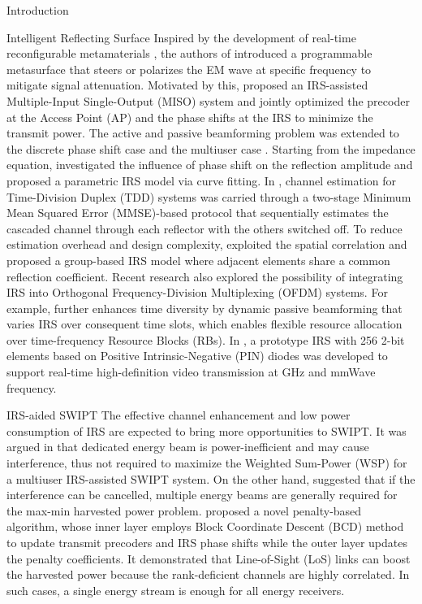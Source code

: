 \documentclass[journal]{IEEEtran}
\begin{document}
\begin{section}{Introduction}
\begin{subsection}{Intelligent Reflecting Surface}
			Inspired by the development of real-time reconfigurable metamaterials \cite{Cui2014}, the authors of \cite{Liaskos2018} introduced a programmable metasurface that steers or polarizes the EM wave at specific frequency to mitigate signal attenuation. Motivated by this, \cite{Wu2018} proposed an IRS-assisted Multiple-Input Single-Output (MISO) system and jointly optimized the precoder at the Access Point (AP) and the phase shifts at the IRS to minimize the transmit power. The active and passive beamforming problem was extended to the discrete phase shift case \cite{Wu2019a} and the multiuser case \cite{Wu2019}. Starting from the impedance equation, \cite{Abeywickrama2019} investigated the influence of phase shift on the reflection amplitude and proposed a parametric IRS model via curve fitting. In \cite{Nadeem2019}, channel estimation for Time-Division Duplex (TDD) systems was carried through a two-stage Minimum Mean Squared Error (MMSE)-based protocol that sequentially estimates the cascaded channel through each reflector with the others switched off. To reduce estimation overhead and design complexity, \cite{Yang2019} exploited the spatial correlation and proposed a group-based IRS model where adjacent elements share a common reflection coefficient. Recent research also explored the possibility of integrating IRS into Orthogonal Frequency-Division Multiplexing (OFDM) systems. For example, \cite{Yang2020} further enhances time diversity by dynamic passive beamforming that varies IRS over consequent time slots, which enables flexible resource allocation over time-frequency Resource Blocks (RBs). In \cite{Dai2020}, a prototype IRS with \num{256} \num{2}-bit elements based on Positive Intrinsic-Negative (PIN) diodes was developed to support real-time high-definition video transmission at \si{GHz} and mmWave frequency.
		\end{subsection}


		\begin{subsection}{IRS-aided SWIPT}
			The effective channel enhancement and low power consumption of IRS are expected to bring more opportunities to SWIPT. It was argued in \cite{Wu2019b} that dedicated energy beam is power-inefficient and may cause interference, thus not required to maximize the Weighted Sum-Power (WSP) for a multiuser IRS-assisted SWIPT system. On the other hand, \cite{Tang2019} suggested that if the interference can be cancelled, multiple energy beams are generally required for the max-min harvested power problem. \cite{Wu2019c} proposed a novel penalty-based algorithm, whose inner layer employs Block Coordinate Descent (BCD) method to update transmit precoders and IRS phase shifts while the outer layer updates the penalty coefficients. It demonstrated that Line-of-Sight (LoS) links can boost the harvested power because the rank-deficient channels are highly correlated. In such cases, a single energy stream is enough for all energy receivers.


\end{subsection}
\end{section}
\end{document}
